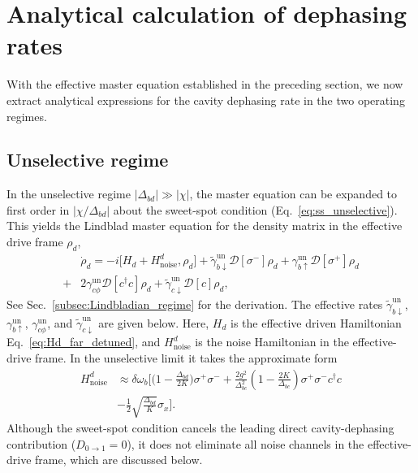 \section{Analytical calculation of dephasing rates}
\label{sec:analytical_rates}

With the effective master equation established in the preceding section, we now extract analytical expressions for the cavity dephasing rate in the two operating regimes.

\subsection{Unselective regime}
\label{subsec:unselective_analytical}

In the unselective regime $|\Delta_{bd}|\gg|\chi|$, the master equation can be expanded to first order in $|\chi/\Delta_{bd}|$ about the sweet-spot condition (Eq.\ \eqref{eq:ss_unselective}). This yields the Lindblad master equation for the density matrix in the effective drive frame $\rho_d$,
\begin{align}
\label{eq:Ldiss_unselective}
&\dot{\rho}_d = -i \bigl[ H_d + H_{\text{noise}}^d , \rho_d \bigr] \nonumber 
+ \widetilde{\gamma}_{b\downarrow}^{\mathrm{un}} \mathcal{D}[\sigma^-]\rho_d
+ \gamma_{b\uparrow}^{\mathrm{un}} \mathcal{D}[\sigma^+]\rho_d\\
+ &2\gamma_{c\phi}^{\mathrm{un}} \mathcal{D}[c^\dagger c]\rho_d
+ \widetilde{\gamma}_{c\downarrow}^{\mathrm{un}} \mathcal{D}[c]\rho_d,
\end{align}
See Sec.~\ref{subsec:Lindbladian_regime} for the derivation.
The effective rates $\widetilde{\gamma}_{b\downarrow}^{\mathrm{un}}$, $\gamma_{b\uparrow}^{\mathrm{un}}$, $\gamma_{c\phi}^{\mathrm{un}}$, and $\widetilde{\gamma}_{c\downarrow}^{\mathrm{un}}$ are given below.
Here, $H_d$ is the effective driven Hamiltonian Eq.\ \eqref{eq:Hd_far_detuned}, and $H_{\text{noise}}^d$ is the noise Hamiltonian in the effective-drive frame. In the unselective limit it takes the approximate form
\begin{align}
\label{eq:Hnoise_unselective}
H_{\text{noise}}^d &\approx \delta \omega_b \Bigg[ \big(1- \frac{\Delta_{bd}}{2K}\big) \sigma^+ \sigma^- \nonumber+ \frac{2 g^2}{\Delta_{bc}^2} \left( 1 - \frac{2 K}{\Delta_{bc}} \right) \sigma^+ \sigma^- c^\dagger c  
\\
&-\frac{1}{2} \sqrt{\frac{\Delta_{bd}}{K}} \sigma_x \Bigg].
\end{align}
Although the sweet-spot condition cancels the leading direct cavity-dephasing contribution (\(D_{0\to1}=0\)), it does not eliminate all noise channels in the effective-drive frame, which are discussed below.
